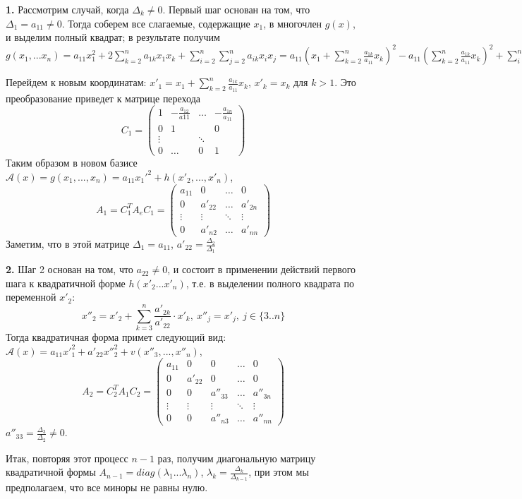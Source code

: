  \textbf{1.} Рассмотрим случай, когда $\Delta_k\ne0$. Первый шаг основан на 
 том, что $\Delta_1=a_{11}\ne0$. Тогда соберем все слагаемые, содержащие $x_1$,
 в многочлен $g(x)$, и
 выделим полный квадрат; в результате получим
 $g(x_1,...x_n)=a_{11}x_1^2+2\sum\limits_{k=2}^na_{1k}x_1x_k+
 \sum\limits_{i=2}^n\sum\limits_{j=2}^na_{ik}x_ix_j=a_{11}(x_1+
 \sum\limits^n_{k=2}\frac{a_{1k}}{a_{11}}x_k)^2-a_{11}
 (\sum\limits^n_{k=2}\frac{a_{1k}}{a_{11}}x_k)^2+\sum\limits_{i=2}^n
 \sum\limits_{j=2}^na_{ik}x_ix_k$
 
 Перейдем к новым координатам: $x'_1=x_1+\sum\limits^n_{k=2}\frac{a_{1k}}
 {a_{11}}x_k$, $x'_k=x_k$ для $k>1$.
 Это преобразование приведет к матрице перехода
 $$C_1=\begin{pmatrix}1&-\frac{a_{12}}{a{11}}&\ldots&-\frac{a_{1n}}{a_{11}}
 \\0&1&&0\\\vdots&&\ddots&\\0&\ldots&0&1\end{pmatrix}$$
 Таким образом в новом базисе $\mathcal A(x)=g(x_1,...,x_n)=a_{11}x_1'^2+
 h(x'_2,...,x'_n)$,
 $$A_1=C_1^TA_eC_1=\begin{pmatrix}a_{11}&0&\ldots&0\\0&a'_{22}&\ldots&a'_{2n}
 \\\vdots&\vdots&\ddots&\vdots\\0&a'_{n2}&\ldots&a'_{nn}\end{pmatrix}$$
 Заметим, что в этой матрице $\Delta_1=a_{11}$, $a'_{22}=\frac{\Delta_2}
 {\Delta_1}$
 
 \textbf{2.} Шаг 2 основан на том, что $a_{22}\ne0$, и состоит в применении 
 действий первого шага к квадратичной форме $h(x'_2...x'_n)$, т.е. в выделении
 полного квадрата по переменной $x'_2$:
 $$x''_2=x'_2+\sum\limits_{k=3}^n\frac{a'_{2k}}{a'_{22}}\cdot x'_k,~x''_j=
 x'_j,~j\in\{3..n\}$$
 Тогда квадратичная форма примет следующий вид: $\mathcal A(x)=a_{11}x'^2_1
 +a'_{22}x''^2_2+v(x''_3,...,x''_n)$,
 $$A_2=C_2^TA_1C_2=\begin{pmatrix}a_{11}&0&0&\ldots&0\\0&a'_{22}&0&\ldots&0\\
 0&0&a''_{33}&\ldots&a''_{3n}\\\vdots&\vdots&\vdots&\ddots&\vdots\\0&0&a''
_{n3}&\ldots&a''_{nn}\end{pmatrix}$$
 $a''_{33}=\frac{\Delta_3}{\Delta_2}\ne0$.
 
Итак, повторяя этот процесс $n-1$ раз, получим диагональную матрицу 
квадратичной формы $A_{n-1}=diag(\lambda_1...\lambda_n)$, 
$\lambda_k=\frac{\Delta_k}{\Delta_{k-1}}$, при этом мы предполагаем, что все
миноры не равны нулю. 
 
